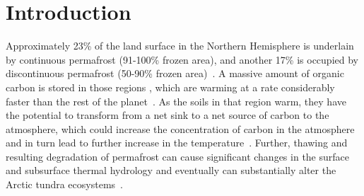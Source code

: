 \documentclass[review]{elsarticle}
\begin{document}
\linenumbers

\section{Introduction}

Approximately 23\% of the land surface in the Northern Hemisphere is underlain by continuous permafrost (91-100\% frozen area), and another 17\% is occupied by discontinuous permafrost (50-90\% frozen area)~\cite{brown1997circum,jorgenson2001permafrost}. A massive amount of organic carbon is stored in those regions \cite{tarnocai2009soil}, which are warming at a rate considerably faster than the rest of the planet~\cite{turner2007arctic, hansen1999giss, assessment2004impacts}.  As the soils in that region warm, they have the potential to transform from a net sink to a net source of carbon to the atmosphere, which could increase the concentration of carbon in the atmosphere and in turn lead to further increase in the temperature~\cite{billings1982arctic}. Further, thawing and resulting degradation of permafrost can cause significant changes in the surface and subsurface thermal hydrology and eventually can substantially alter the Arctic tundra ecosystems~\cite{osterkamp1983response, walvoord2007increased, lyon2009estimation, pachauri2014climate,koven2013analysis}. 
\end{document}
